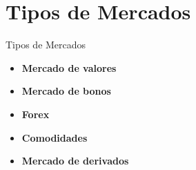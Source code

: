 \section{Tipos de Mercados}

\begin{frame}{Tipos de Mercados}
    \begin{itemize}
        \item<1-> \textbf<1>{Mercado de valores}
        \item<2-> \textbf<2>{Mercado de bonos}
        \item<3-> \textbf<3>{Forex}
        \item<4-> \textbf<4>{Comodidades}
        \item<5-> \textbf<5>{Mercado de derivados}
    \end{itemize}
\end{frame}